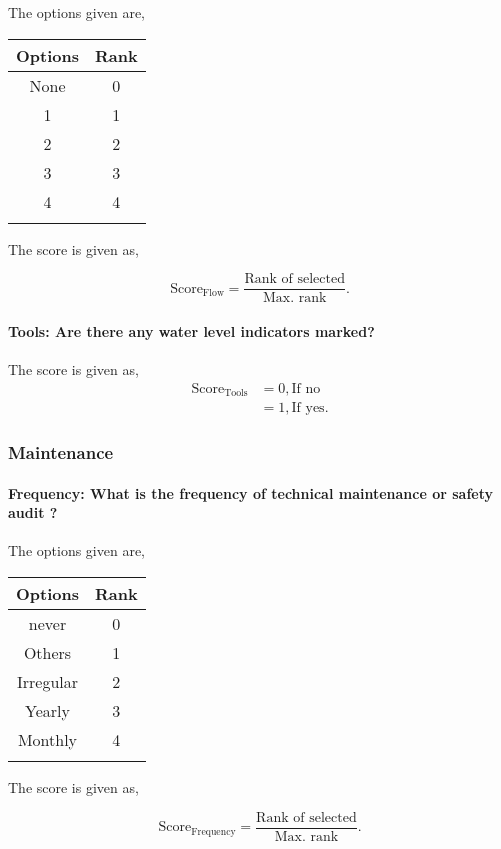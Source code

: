 \documentclass[oneside,twocolumn]{article}
\newcommand{\tsub}[2]{\text{#1}_{\text{#2}}}
\newcommand{\dsub}[2]{\dfrac{\text{#1}}{\text{#2}}}
\newcommand{\singsel}[1]
{
	\[
		\tsub{Score}{#1} = \dsub{Rank of selected}{Max. rank}.
	\]
}
\newenvironment{ttable}
{
\begin{center}
\begin{tabular}{c|c}
\hline
}
{
\\ \hline
\end{tabular}
\end{center}
}
\begin{document}
The options given are,
\begin{ttable}
Options & Rank \\ \hline
None & 0 \\
1 & 1 \\
2 & 2 \\
3 & 3 \\
4 & 4 \\
\hline
\end{ttable}
The score is given as,
\singsel{Flow}
\paragraph{Tools: 
Are there any water level indicators marked? 
}

The score is given as,
\begin{align*}
\tsub{Score}{Tools} &= 0, \text{If no} \\
        &= 1, \text{If yes}.
\end{align*}
\subsubsection{Maintenance}

\paragraph{Frequency: What is the frequency of technical maintenance or safety audit ?}

The options given are,
\begin{ttable}
Options & Rank \\ \hline
never & 0 \\
Others & 1 \\
Irregular & 2 \\
Yearly & 3 \\
Monthly & 4 \\
\hline
\end{ttable}
The score is given as,
\singsel{Frequency}
\end{document}
